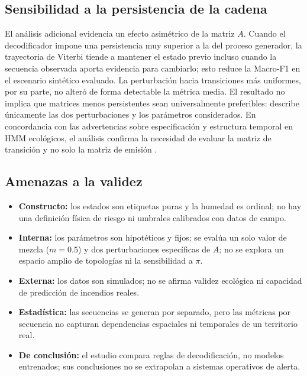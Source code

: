 \documentclass[11pt,letterpaper]{article}
\begin{document}
\subsection{Sensibilidad a la persistencia de la cadena}

El análisis adicional evidencia un efecto asimétrico de la matriz $A$. Cuando el decodificador impone una persistencia muy superior a la del proceso generador, la trayectoria de Viterbi tiende a mantener el estado previo incluso cuando la secuencia observada aporta evidencia para cambiarlo; esto reduce la Macro-F1 en el escenario sintético evaluado. La perturbación hacia transiciones más uniformes, por su parte, no alteró de forma detectable la métrica media. El resultado no implica que matrices menos persistentes sean universalmente preferibles: describe únicamente las dos perturbaciones y los parámetros considerados. En concordancia con las advertencias sobre especificación y estructura temporal en HMM ecológicos, el análisis confirma la necesidad de evaluar la matriz de transición y no solo la matriz de emisión \cite{glennie2022,rand2024}.

\subsection{Amenazas a la validez}

\begin{itemize}
  \item \textbf{Constructo:} los estados son etiquetas puras y la humedad es ordinal; no hay una definición física de riesgo ni umbrales calibrados con datos de campo.
  \item \textbf{Interna:} los parámetros son hipotéticos y fijos; se evalúa un solo valor de mezcla (\(m=0.5\)) y dos perturbaciones específicas de \(A\); no se explora un espacio amplio de topologías ni la sensibilidad a \(\pi\).
  \item \textbf{Externa:} los datos son simulados; no se afirma validez ecológica ni capacidad de predicción de incendios reales.
  \item \textbf{Estadística:} las secuencias se generan por separado, pero las métricas por secuencia no capturan dependencias espaciales ni temporales de un territorio real.
  \item \textbf{De conclusión:} el estudio compara reglas de decodificación, no modelos entrenados; sus conclusiones no se extrapolan a sistemas operativos de alerta.
\end{itemize}
\end{document}
